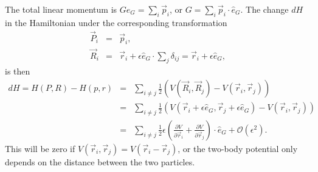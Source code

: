 \documentclass[letterpaper,11pt]{article}
\begin{document}
The total linear momentum is $G \hat{e}_G = \sum_i \vec{p}_i$, or $G = \sum_i \vec{p}_i \cdot \hat{e}_G$.  The change $dH$ in the Hamiltonian under the corresponding transformation
\begin{eqnarray*}
 \vec{P}_i & = & \vec{p}_i, \\
 \vec{R}_i & = & \vec{r}_i + \epsilon \hat{e}_G \cdot \sum_j \delta_{ij} = \vec{r}_i + \epsilon \hat{e}_G,
\end{eqnarray*}
is then
\begin{eqnarray*}
 dH = H(P,R) - H(p,r) & = & \sum_{i \neq j} \frac{1}{2} \left( V(\vec{R}_i,\vec{R}_j) - V(\vec{r}_i,\vec{r}_j) \right) \\
 & = & \sum_{i \neq j} \frac{1}{2} \left( V(\vec{r}_i + \epsilon \hat{e}_G,\vec{r}_j + \epsilon \hat{e}_G) - V(\vec{r}_i,\vec{r}_j) \right) \\
 & = & \sum_{i \neq j} \frac{1}{2} \epsilon \left( \frac{\partial V}{\partial \vec{r}_i} + \frac{\partial V}{\partial \vec{r}_j} \right) \cdot \hat{e}_G + \mathcal{O}(\epsilon^2).
\end{eqnarray*}
This will be zero if $V(\vec{r}_i,\vec{r}_j) = V(\vec{r}_i - \vec{r}_j)$, or the two-body potential only depends on the distance between the two particles.
\end{document}
